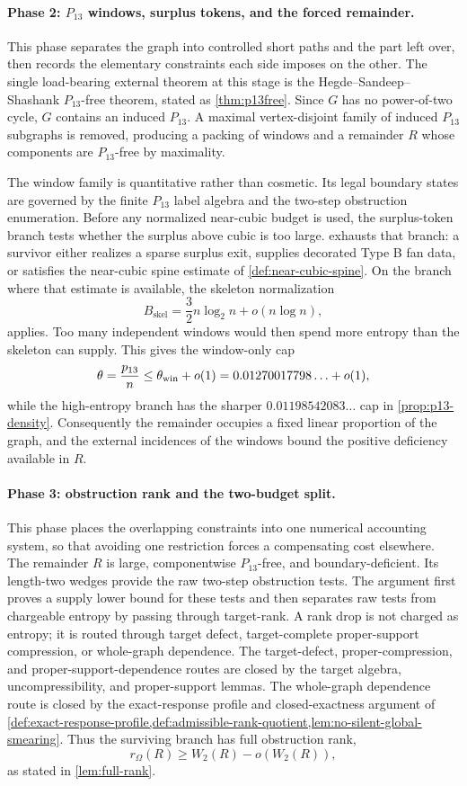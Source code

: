 \documentclass[11pt]{article}
\begin{document}
\paragraph{Phase 2: $P_{13}$ windows, surplus tokens, and the forced remainder.}
This phase separates the graph into controlled short paths and the part left
over, then records the elementary constraints each side imposes on the other.
The single load-bearing external theorem at this stage is the Hegde--Sandeep--Shashank
$P_{13}$-free theorem, stated as \cref{thm:p13free}.  Since $G$ has no power-of-two cycle, $G$ contains an induced $P_{13}$.  A maximal vertex-disjoint family of
induced $P_{13}$ subgraphs is removed, producing a packing of windows and a
remainder $R$ whose components are $P_{13}$-free by maximality.

The window family is quantitative rather than cosmetic.  Its legal boundary
states are governed by the finite $P_{13}$ label algebra and the two-step obstruction
enumeration.  Before any normalized near-cubic budget is used, the
surplus-token branch tests whether the surplus above cubic is too large.
 exhausts that branch: a
survivor either realizes a sparse surplus exit, supplies decorated Type B fan
data, or satisfies the near-cubic spine estimate of
\cref{def:near-cubic-spine}.  On the branch where that estimate is available,
the skeleton normalization
\[
B_{\mathrm{skel}}=\frac32 n\log_2 n+o(n\log n),
\]
applies.  Too many independent windows would then spend more entropy than the
skeleton can supply.  This gives the window-only cap
\[
\theta=\frac{p_{13}}{n}\le \theta_{\rm win}+o(1)
=0.01270017798\ldots+o(1),
\]
while the high-entropy branch has the sharper
$0.01198542083\ldots$ cap in \cref{prop:p13-density}.  Consequently the
remainder occupies a fixed linear proportion of the graph, and the external
incidences of the windows bound the positive deficiency available in $R$.

\paragraph{Phase 3: obstruction rank and the two-budget split.}
This phase places the overlapping constraints into one numerical accounting
system, so that avoiding one restriction forces a compensating cost elsewhere.
The remainder $R$ is large, componentwise $P_{13}$-free, and boundary-deficient.
Its length-two wedges provide the raw two-step obstruction tests.  The argument first
proves a supply lower bound for these tests and then separates raw tests from
chargeable entropy by passing through target-rank.  A rank drop is not charged
as entropy; it is routed through target defect, target-complete proper-support
compression, or whole-graph dependence.  The target-defect, proper-compression,
and proper-support-dependence routes are closed by the target algebra,
uncompressibility, and proper-support lemmas.  The whole-graph dependence
route is closed by the exact-response profile and closed-exactness argument of
\cref{def:exact-response-profile,def:admissible-rank-quotient,lem:no-silent-global-smearing}.
Thus the surviving branch has full obstruction rank,
\[
r_\Omega(R)\ge W_2(R)-o(W_2(R)),
\]
as stated in \cref{lem:full-rank}.
\end{document}
